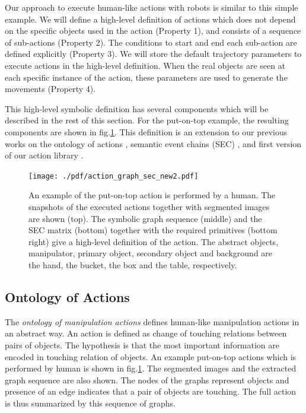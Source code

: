 Our approach to execute human-like actions with robots is similar to this simple example.
We will define a high-level definition of actions which does not depend on the specific objects used in the action (Property 1),
and consists of a sequence of sub-actions (Property 2).
The conditions to start and end each sub-action are defined explicitly (Property 3).
We will store the default trajectory parameters to execute actions in the high-level definition.
When the real objects are seen at each specific instance of the action, these parameters are used to generate the movements (Property 4).


This high-level symbolic definition has several components which will be described in the rest of this section.
For the put-on-top example, the resulting components are shown in fig.\ref{fig:action_graph_sec}.
This definition is an extension to our previous works on the ontology of actions \cite{TAMD13}, semantic event chains (SEC) \cite{Aksoy11b},
and first version of our action library \cite{aein2013toward}.
\begin{figure}
      \centering
      \texttt{[image: ./pdf/action\_graph\_sec\_new2.pdf]}
      \caption{ An example of the put-on-top action is performed by a human. 
The snapshots of the executed actions together with segmented images are shown (top).
The symbolic graph sequence (middle) and the SEC matrix (bottom) together with 
the required primitives (bottom right) give a high-level definition of the action.
The abstract objects, manipulator, primary object, secondary object and background are the hand, the bucket, the box and the table, respectively.}
      \label{fig:action_graph_sec}
\end{figure}
\subsection{Ontology of Actions}
\label{sec:ontology}
The \textit{ontology of manipulation actions} \cite{TAMD13} defines human-like manipulation actions in an abstract way.
An action is defined as change of touching relations between pairs of objects.
The hypothesis is that the most important information are encoded in touching relation of objects.
An example put-on-top actions which is performed by human is shown in fig.\ref{fig:action_graph_sec}.
The segmented images and the extracted graph sequence are also shown.
The nodes of the graphs represent objects and presence of an edge indicates that a pair of objects are touching.
The full action is thus summarized by this sequence of graphs.


